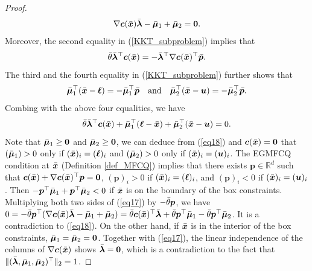 \documentclass[aos]{imsart}
\numberwithin{equation}{section}
\theoremstyle{plain}
\begin{document}
\begin{appendix}
\begin{proof}
    \begin{equation}
    \label{eq17}
        \nabla \bm{c}(\Bar{\bm{x}}) \Bar{\bm{\lambda}} - \Bar{\bm{\mu}}_{1} + \Bar{\bm{\mu}}_{2} = \bm{0}.
    \end{equation}
    Moreover, the second equality in (\ref{KKT_subproblem}) implies that
    \begin{equation*}
        \Bar{\theta} \Bar{\bm{\lambda}}^{\top} \bm{c}(\Bar{\bm{x}}) =  - \Bar{\bm{\lambda}}^{\top} \nabla \bm{c}(\Bar{\bm{x}})^{\top} \Bar{\bm{p}}.
    \end{equation*}
     The third and the fourth equality in (\ref{KKT_subproblem}) further shows that
     \begin{equation*}
         \Bar{\bm{\mu}}_{1}^{\top} (\Bar{\bm{x}} - \bm{\ell}) = -\Bar{\bm{\mu}}_{1}^{\top} \Bar{\bm{p}} \quad \text{and} \quad \Bar{\bm{\mu}}_{2}^{\top} (\Bar{\bm{x}} - \bm{u}) = -\Bar{\bm{\mu}}_{2}^{\top} \Bar{\bm{p}}.
     \end{equation*}
     Combing with the above four equalities, we have
     \begin{equation}
     \label{eq18}
          \Bar{\theta} \Bar{\bm{\lambda}}^{\top} \bm{c}(\Bar{\bm{x}}) + \Bar{\bm{\mu}}_{1}^{\top} (\bm{\ell} - \Bar{\bm{x}}) + \Bar{\bm{\mu}}_{2}^{\top} (\Bar{\bm{x}} - \bm{u}) = 0.
     \end{equation}
     Note that $\Bar{\bm{\mu}}_{1} \geq \bm{0}$ and $\Bar{\bm{\mu}}_{2} \geq \bm{0}$, we can deduce from (\ref{eq18}) and $\bm{c}(\Bar{\bm{x}}) = \bm{0}$ that $(\Bar{\bm{\mu}}_{1}) > 0$ only if $(\Bar{\bm{x}})_{i} = (\bm{\ell})_i$ and $(\Bar{\bm{\mu}}_{2}) > 0$ only if $(\Bar{\bm{x}})_{i} = (\bm{u})_i$. The EGMFCQ condition at $\Bar{\bm{x}}$ (Definition \ref{def_MFCQ}) implies that there exists $\bm{p} \in \mathbb{R}^{d}$ such that $\bm{c}(\Bar{\bm{x}}) + \nabla \bm{c}(\Bar{\bm{x}})^{\top} \bm{p} = \bm{0}$, $(\bm{p})_{i} > 0$ if $(\Bar{\bm{x}})_{i} = (\bm{\ell})_i$, and $(\bm{p})_{i} < 0$ if $(\Bar{\bm{x}})_{i} = (\bm{u})_i$. Then $- \bm{p}^{\top} \Bar{\bm{\mu}}_{1} + \bm{p}^{\top} \Bar{\bm{\mu}}_{2} < 0$ if $\Bar{\bm{x}}$ is on the boundary of the box constraints. 
     Multiplying both two sides of (\ref{eq17}) by $-\Bar{\theta}\bm{p}$, we have $0 = -\Bar{\theta} \bm{p}^{\top}(\nabla \bm{c}(\Bar{\bm{x}}) \Bar{\bm{\lambda}} - \Bar{\bm{\mu}}_{1} + \Bar{\bm{\mu}}_{2}) = \Bar{\theta}\bm{c}(\Bar{\bm{x}})^{\top} \Bar{\bm{\lambda}} + \Bar{\theta} \bm{p}^{\top} \Bar{\bm{\mu}}_{1} - \Bar{\theta} \bm{p}^{\top} \Bar{\bm{\mu}}_{2}$. It is a contradiction to (\ref{eq18}). On the other hand, if $\Bar{\bm{x}}$ is in the interior of the box constraints, $\Bar{\bm{\mu}}_{1} = \Bar{\bm{\mu}}_{2} = \bm{0}$. Together with (\ref{eq17}), the linear independence of the columns of $\nabla \bm{c}(\Bar{\bm{x}})$ shows $\Bar{\bm{\lambda}} = \bm{0}$, which is a contradiction to the fact that $\|(\Bar{\bm{\lambda}}, \Bar{\bm{\mu}}_{1}, \Bar{\bm{\mu}}_{2})^{\top}\|_2 = 1$.
\end{proof}



\end{appendix}
\end{document}
